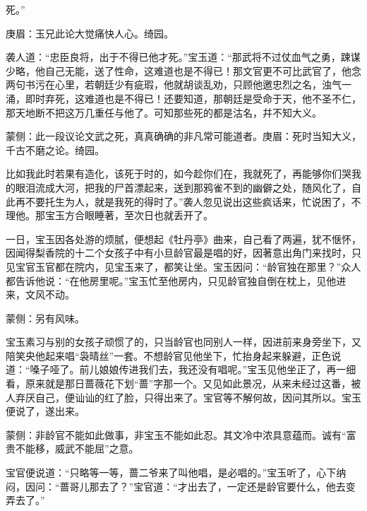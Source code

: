 \begin{parag}
死。”\begin{note}庚眉：玉兄此论大觉痛快人心。绮园。\end{note}袭人道：“忠臣良将，出于不得已他才死。”宝玉道：“那武将不过仗血气之勇，踈谋少略，他自己无能，送了性命，这难道也是不得已！那文官更不可比武官了，他念两句书污在心里，若朝廷少有疵瑕，他就胡谈乱劝，只顾他邀忠烈之名，浊气一涌，即时弃死，这难道也是不得已！还要知道，那朝廷是受命于天，他不圣不仁，那天地断不把这万几重任与他了。可知那些死的都是沽名，幷不知大义。\begin{note}蒙侧：此一段议论文武之死，真真确确的非凡常可能道者。庚眉：死时当知大义，千古不磨之论。绮园。\end{note}比如我此时若果有造化，该死于时的，如今趁你们在，我就死了，再能够你们哭我的眼泪流成大河，把我的尸首漂起来，送到那鸦雀不到的幽僻之处，随风化了，自此再不要托生为人，就是我死的得时了。”袭人忽见说出这些疯话来，忙说困了，不理他。那宝玉方合眼睡著，至次日也就丢开了。
\end{parag}


\begin{parag}
    一日，宝玉因各处游的烦腻，便想起《牡丹亭》曲来，自己看了两遍，犹不惬怀，因闻得梨香院的十二个女孩子中有小旦龄官最是唱的好，因著意出角门来找时，只见宝官玉官都在院内，见宝玉来了，都笑让坐。宝玉因问：“龄官独在那里？”众人都告诉他说：“在他房里呢。”宝玉忙至他房内，只见龄官独自倒在枕上，见他进来，文风不动。\begin{note}蒙侧：另有风味。\end{note}宝玉素习与别的女孩子顽惯了的，只当龄官也同别人一样，因进前来身旁坐下，又陪笑央他起来唱“袅晴丝”一套。不想龄官见他坐下，忙抬身起来躲避，正色说道：“嗓子哑了。前儿娘娘传进我们去，我还没有唱呢。”宝玉见他坐正了，再一细看，原来就是那日蔷薇花下划“蔷”字那一个。又见如此景况，从来未经过这番，被人弃厌自己，便讪讪的红了脸，只得出来了。宝官等不解何故，因问其所以。宝玉便说了，遂出来。\begin{note}蒙侧：非龄官不能如此做事，非宝玉不能如此忍。其文冷中浓具意蕴而。诚有“富贵不能移，威武不能屈”之意。\end{note}宝官便说道：“只略等一等，蔷二爷来了叫他唱，是必唱的。”宝玉听了，心下纳闷，因问：“蔷哥儿那去了？”宝官道：“才出去了，一定还是龄官要什么，他去变弄去了。”
\end{parag}


